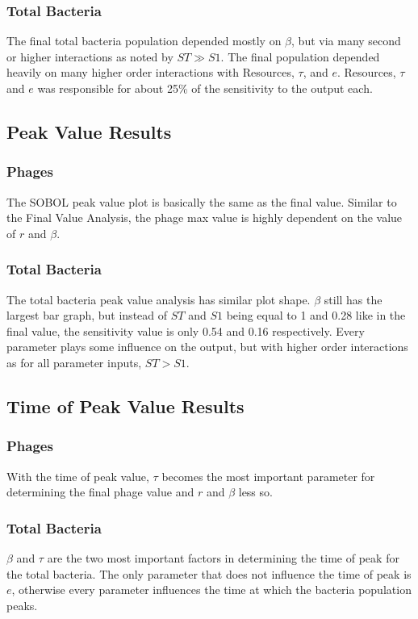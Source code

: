 \subsubsection{Total Bacteria}
The final total bacteria population depended mostly on $\beta$, but via many second or higher interactions as noted by $ST \gg S1$. 
The final population depended heavily on many higher order interactions with Resources, $\tau$, and $e$. 
Resources, $\tau$ and $e$ was responsible for about 25\% of the sensitivity to the output each. 

\subsection{Peak Value Results}
\subsubsection{Phages}
The SOBOL peak value plot is basically the same as the final value. 
Similar to the Final Value Analysis, the phage max value is highly dependent on the value of $r$ and $\beta$. 
\subsubsection{Total Bacteria}
The total bacteria peak value analysis has similar plot shape. 
$\beta$ still has the largest bar graph, but instead of $ST$ and $S1$ being equal to 1 and 0.28 like in the final value, the sensitivity value is only 0.54 and 0.16 respectively. 
Every parameter plays some influence on the output, but with higher order interactions as for all parameter inputs, $ST > S1$. 

\subsection{Time of Peak Value Results}
\subsubsection{Phages}
With the time of peak value, $\tau$ becomes the most important parameter for determining the final phage value and $r$ and $\beta$ less so. 
\subsubsection{Total Bacteria}
$\beta$ and $\tau$ are the two most important factors in determining the time of peak for the total bacteria. 
The only parameter that does not influence the time of peak is $e$, otherwise every parameter influences the time at which the bacteria population peaks. 


